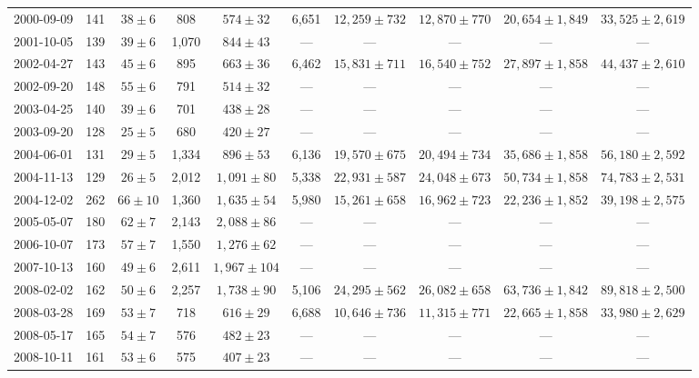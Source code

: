 \documentclass[12pt,letterpaper]{article}
\begin{document}
\begin{landscape}
\begin{longtable}{cccccccccc}
	{2000-09-09} & 141 & {$38  \pm  6$} & 808 & {$574 \pm 32$} & 6,651 & {$12,259 \pm 732$} & {$12,870 \pm 770$} & {$20,654 \pm 1,849$} & {$33,525 \pm 2,619$} \\
	{2001-10-05} & 139 & {$39  \pm  6$} & 1,070 & {$844 \pm 43$} & --- & --- & --- & --- & --- \\
	{2002-04-27} & 143 & {$45  \pm  6$} & 895 & {$663 \pm 36$} & 6,462 & {$15,831 \pm 711$} & {$16,540 \pm 752$} & {$27,897 \pm 1,858$} & {$44,437 \pm 2,610$} \\
	{2002-09-20} & 148 & {$55  \pm  6$} & 791 & {$514 \pm 32$} & --- & --- & --- & --- & --- \\
	{2003-04-25} & 140 & {$39  \pm  6$} & 701 & {$438 \pm 28$} & --- & --- & --- & --- & --- \\
	{2003-09-20} & 128 & {$25  \pm  5$} & 680 & {$420 \pm 27$} & --- & --- & --- & --- & --- \\
	{2004-06-01} & 131 & {$29  \pm  5$} & 1,334 & {$896 \pm 53$} & 6,136 & {$19,570 \pm 675$} & {$20,494 \pm 734$} & {$35,686 \pm 1,858$} & {$56,180 \pm 2,592$} \\
	{2004-11-13} & 129 & {$26  \pm  5$} & 2,012 & {$1,091 \pm 80$} & 5,338 & {$22,931 \pm 587$} & {$24,048 \pm 673$} & {$50,734 \pm 1,858$} & {$74,783 \pm 2,531$} \\
	{2004-12-02} & 262 & {$66  \pm  10$} & 1,360 & {$1,635 \pm 54$} & 5,980 & {$15,261 \pm 658$} & {$16,962 \pm 723$} & {$22,236 \pm 1,852$} & {$39,198 \pm 2,575$} \\
	{2005-05-07} & 180 & {$62  \pm  7$} & 2,143 & {$2,088 \pm 86$} & --- & --- & --- & --- & --- \\
	{2006-10-07} & 173 & {$57  \pm  7$} & 1,550 & {$1,276 \pm 62$} & --- & --- & --- & --- & --- \\
	{2007-10-13} & 160 & {$49  \pm  6$} & 2,611 & {$1,967 \pm 104$} & --- & --- & --- & --- & --- \\
	{2008-02-02} & 162 & {$50  \pm  6$} & 2,257 & {$1,738 \pm 90$} & 5,106 & {$24,295 \pm 562$} & {$26,082 \pm 658$} & {$63,736 \pm 1,842$} & {$89,818 \pm 2,500$} \\
	{2008-03-28} & 169 & {$53  \pm  7$} & 718 & {$616 \pm 29$} & 6,688 & {$10,646 \pm 736$} & {$11,315 \pm 771$} & {$22,665 \pm 1,858$} & {$33,980 \pm 2,629$} \\
	{2008-05-17} & 165 & {$54  \pm  7$} & 576 & {$482 \pm 23$} & --- & --- & --- & --- & --- \\
	{2008-10-11} & 161 & {$53  \pm  6$} & 575 & {$407 \pm 23$} & --- & --- & --- & --- & --- \\

\end{longtable}
\end{landscape}
\end{document}
